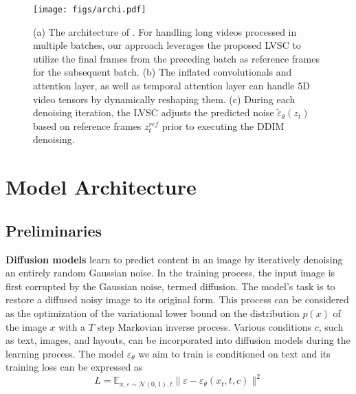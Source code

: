 \begin{figure*}[t]
    \centering
    \texttt{[image: figs/archi.pdf]}
    \caption{(a) The architecture of \ours. For handling long videos processed in multiple batches, our approach leverages the proposed LVSC to utilize the final frames from the preceding batch as reference frames for the subsequent batch. (b) The inflated convolutionals and attention layer, as well as temporal attention layer can handle 5D video tensors by dynamically reshaping them. (c) During each denoising iteration, the LVSC adjusts the predicted noise $\tilde{\varepsilon}_{\theta}(z_t)$ based on reference frames $z_t^{ref}$ prior to executing the DDIM denoising.}
    \label{fig:model}
\end{figure*}


\section{Model Architecture}
\label{sec:method}

\subsection{Preliminaries}

\textbf{Diffusion models} learn to predict content in an image by iteratively denoising an entirely random Gaussian noise. In the training process, the input image is first corrupted by the Gaussian noise, termed diffusion. The model's task is to restore a diffused noisy image to its original form. This process can be considered as the optimization of the variational lower bound on the distribution $p(x)$ of the image $x$ with a $T$ step Markovian inverse process. Various conditions $c$, such as text, images, and layouts, can be incorporated into diffusion models during the learning process. The model $\varepsilon_\theta$ we aim to train is conditioned on text and its training loss can be expressed as
\begin{equation}
    L = \mathbb{E}_{x,\varepsilon\sim\mathcal{N}(0,1),t}\|\varepsilon - \varepsilon_\theta(x_t, t, c)\|^2
\end{equation}

